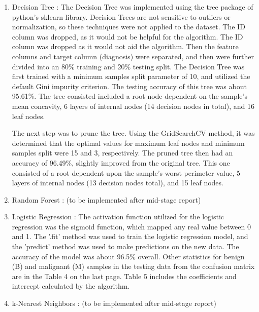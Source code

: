 \documentclass[conference]{IEEEtran}
\begin{document}
\begin{enumerate}
     \item Decision Tree : The Decision Tree was implemented using the tree package of python's sklearn library. Decision Trees are not sensitive to outliers or normalization, so these techniques were not applied to the dataset. The ID column was dropped, as it would not be helpful for the algorithm. The ID column was dropped as it would not aid the algorithm. Then the feature columns and target column (diagnosis) were separated, and then were further divided into an 80\% training and 20\% testing split.
    The Decision Tree was first trained with a minimum samples split parameter of 10, and utilized the default Gini impurity criterion. The testing accuracy of this tree was about 95.61\%. The tree consisted included a root node dependent on the sample's mean concavity, 6 layers of internal nodes (14 decision nodes in total), and 16 leaf nodes.
    
    The next step was to prune the tree. Using the GridSearchCV method, it was determined that the optimal values for maximum leaf nodes and minimum samples split were 15 and 3, respectively. The pruned tree then had an accuracy of 96.49\%, slightly improved from the original tree. This one consisted of a root dependent upon the sample's worst perimeter value, 5 layers of internal nodes (13 decision nodes total), and 15 leaf nodes.

    \item Random Forest : (to be implemented after mid-stage report)

    \item Logistic Regression : The activation function utilized for the logistic regression was the sigmoid function, which mapped any real value between 0 and 1. The '.fit' method was used to train the logistic regression model, and the 'predict' method was used to make predictions on the new data. The accuracy of the model was about 96.5\% overall. Other statistics for benign (B) and malignant (M) samples in the testing data from the confusion matrix are in the Table 4 on the last page. Table 5 includes the coefficients and intercept calculated by the algorithm.
    
    \item k-Nearest Neighbors : (to be implemented after mid-stage report)


\end{enumerate}
\end{document}
